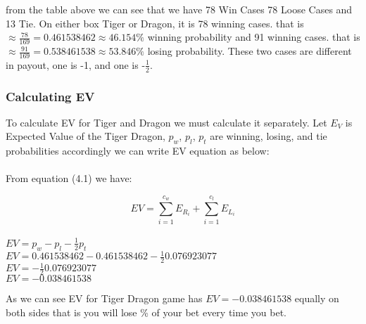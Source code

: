 \documentclass{article}
\begin{document}
from the table above we can see that we have 78 Win Cases 78 Loose Cases and 13 Tie.  On either box Tiger or Dragon, it is 78 winning cases.  that is $\approx\frac{78}{169}=0.461538462\approx46.154\%$ winning probability and 91 winning cases.  that is $\approx\frac{91}{169}=0.538461538\approx53.846\%$ losing probability.  These two cases are different in payout, one is -1, and one is -$\frac{1}{2}$.  \\

\subsubsection{Calculating EV}

To calculate EV for Tiger and Dragon we must calculate it separately.  Let $E_V$ is Expected Value of the Tiger Dragon, $p_w$, $p_l$, $p_t$ are winning, losing, and tie probabilities accordingly we can write EV equation as below:\\ \\
From equation (4.1) we have:
\begin{center}
$$EV=\sum_{i=1}^{c_w}E_{R_i}+\sum_{i=1}^{c_l}E_{L_i}$$\\
$EV=p_w - p_l - \frac{1}{2}p_t$ \\
$EV=0.461538462 - 0.461538462 - \frac{1}{2}0.076923077$ \\
$EV=- \frac{1}{2}0.076923077$\\
$EV=-0.038461538$\\
\end{center}

As we can see EV for Tiger Dragon game has $EV=-0.038461538$ equally on both sides that is you will lose \% of your bet every time you bet.\\
\end{document}
